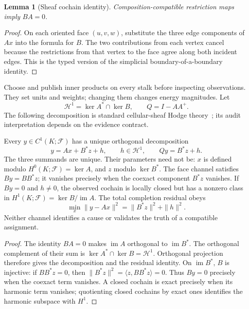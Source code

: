 \documentclass[11pt,a4paper]{article}
\newtheorem{lemma}{Lemma}
\begin{document}
\begin{lemma}[Sheaf cochain identity]\label{lem:chain}
Composition-compatible restriction maps imply $BA=0$.
\end{lemma}
\begin{proof}
On each oriented face $(u,v,w)$, substitute the three edge components of $Ax$ into the formula for $B$. The two contributions from each vertex cancel because the restrictions from that vertex to the face agree along both incident edges. This is the typed version of the simplicial boundary-of-a-boundary identity.
\end{proof}

Choose and publish inner products on every stalk before inspecting observations. They set units and weights; changing them changes energy magnitudes. Let
\[
\mathcal H^1=\ker A^*\cap\ker B,
\qquad Q=I-AA^+.
\]
The following decomposition is standard cellular-sheaf Hodge theory~\cite{hansen2019,curry2013}; its audit interpretation depends on the evidence contract.

\begin{theorem}\label{thm:typed-hodge}
Every $y\in C^1(K;\mathcal F)$ has a unique orthogonal decomposition
\[
y=Ax+ B^*z+h,
\qquad h\in\mathcal H^1,
\qquad Qy=B^*z+h.
\]
The three summands are unique. Their parameters need not be: $x$ is defined modulo $H^0(K;\mathcal F)=\ker A$, and $z$ modulo $\ker B^*$. The face channel satisfies $By=B B^*z$; it vanishes precisely when the coexact component $B^*z$ vanishes. If $By=0$ and $h\ne0$, the observed cochain is locally closed but has a nonzero class in $H^1(K;\mathcal F)=\ker B/\operatorname{im}A$. The total completion residual obeys
\[
\min_x\|y-Ax\|^2=\|B^*z\|^2+\|h\|^2.
\]
Neither channel identifies a cause or validates the truth of a compatible assignment.
\end{theorem}
\begin{proof}
The identity $BA=0$ makes $\operatorname{im}A$ orthogonal to $\operatorname{im}B^*$. The orthogonal complement of their sum is $\ker A^*\cap\ker B=\mathcal H^1$. Orthogonal projection therefore gives the decomposition and the residual identity. On $\operatorname{im}B^*$, $B$ is injective: if $B B^*z=0$, then $\|B^*z\|^2=\langle z,B B^*z\rangle=0$. Thus $By=0$ precisely when the coexact term vanishes. A closed cochain is exact precisely when its harmonic term vanishes; quotienting closed cochains by exact ones identifies the harmonic subspace with $H^1$.
\end{proof}
\end{document}
